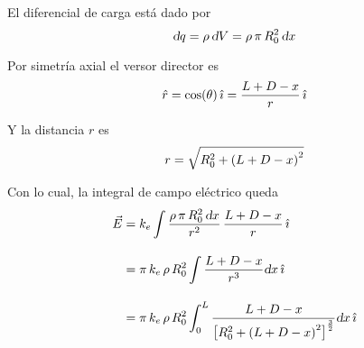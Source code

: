 \documentclass[a5paper,12pt,twoside]{book}
\begin{document}
\begin{mdframed}[style=MyFrame2]

    El diferencial de carga está dado por
    \begin{equation*}
        \textsl{d} q = \rho \, \textsl{d} V
        = \rho \, \pi \, R_0^2 \, \textsl{d} x
    \end{equation*}

    Por simetría axial el versor director es
    \begin{equation*}
        \hat{r} = \cos(\theta) \, \hat{\imath}
        = \frac{L+D-x}{r} \, \hat{\imath}
    \end{equation*}

    Y la distancia $r$ es
    \begin{equation*}
        r = \sqrt{R_0^2 + \left(L+D-x\right)^2}
    \end{equation*}

    Con lo cual, la integral de campo eléctrico queda
    \begin{align*}
        \vec{E} &= k_e \int \frac{\rho \, \pi \, R_0^2 \, \textsl{d} x}{r^2} \, \frac{L+D-x}{r} \, \hat{\imath}
        \\[1em]
        &= \pi \, k_e \, \rho \, R_0^2 \int \frac{L+D-x}{r^3} \textsl{d} x \, \hat{\imath}
        \\[1em]
        &= \pi \, k_e \, \rho \, R_0^2 \int_0^L \frac{L+D-x}{{ \begin{bmatrix} R_0^2 + \left(L+D-x\right)^2 \end{bmatrix} }^{\frac{3}{2}}} \textsl{d} x \, \hat{\imath}
    \end{align*}
\end{mdframed}
\end{document}
